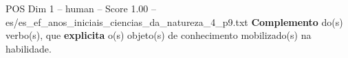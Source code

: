 \begin{textsample}{POS Dim 1 – human – Score 1.00 – es/es\_ef\_anos\_iniciais\_ciencias\_da\_natureza\_4\_p9.txt}  \label{ex:f1_pos_011}
\textbf{Complemento} do(s) verbo(s), que \textbf{explicita} o(s) objeto(s) de conhecimento mobilizado(s) na habilidade.

\end{textsample}
